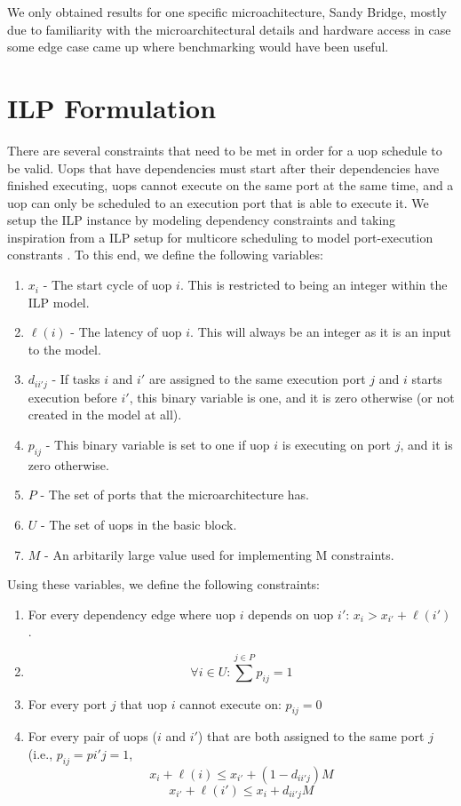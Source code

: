 \documentclass[sigconf]{acmart}
\begin{document}
We only obtained results for one specific microachitecture, Sandy Bridge, mostly due to familiarity with the
microarchitectural details and hardware access in case some edge case came up where benchmarking would have been
useful.

\section{ILP Formulation}
\label{sec:ilp-formulation}

There are several constraints that need to be met in order for a uop schedule to be valid. Uops that have dependencies
must start after their dependencies have finished executing, uops cannot execute on the same port at the same time,
and a uop can only be scheduled to an execution port that is able to execute it. We setup the ILP instance by modeling
dependency constraints and taking inspiration from a ILP setup for multicore scheduling to model port-execution
constrants \cite{ying2009multicoreilp}. To this end, we define the following variables:

\begin{enumerate}
    \item $x_i$ - The start cycle of uop $i$. This is restricted to being an integer within the ILP model.
    \item $\ell(i)$ - The latency of uop $i$. This will always be an integer as it is an input to the model.
    \item $d_{ii'j}$ - If tasks $i$ and $i'$ are assigned to the same execution port $j$ and $i$ starts execution before $i'$, this binary variable is one, and it is zero otherwise (or not created in the model at all).
    \item $p_{ij}$ - This binary variable is set to one if uop $i$ is executing on port $j$, and it is zero otherwise.
    \item $P$ - The set of ports that the microarchitecture has.
    \item $U$ - The set of uops in the basic block.
    \item $M$ - An arbitarily large value used for implementing M constraints.
\end{enumerate}

Using these variables, we define the following constraints:

\begin{enumerate}
    \item For every dependency edge where uop $i$ depends on uop $i'$: $x_i>x_{i'}+\ell(i')$.
    \item $$\forall i \in U : \sum^{j \in P} p_{ij}=1$$
    \item For every port $j$ that uop $i$ cannot execute on: $p_{ij}=0$
    \item For every pair of uops ($i$ and $i'$) that are both assigned to the same port $j$ (i.e., $p_{ij}=p{i'j}=1$,
    $$x_i+\ell(i)\leq x_{i'}+(1-d_{ii'j})M$$
    $$x_{i'}+\ell(i')\leq x_{i}+d_{ii'j}M$$
\end{enumerate}
\end{document}

